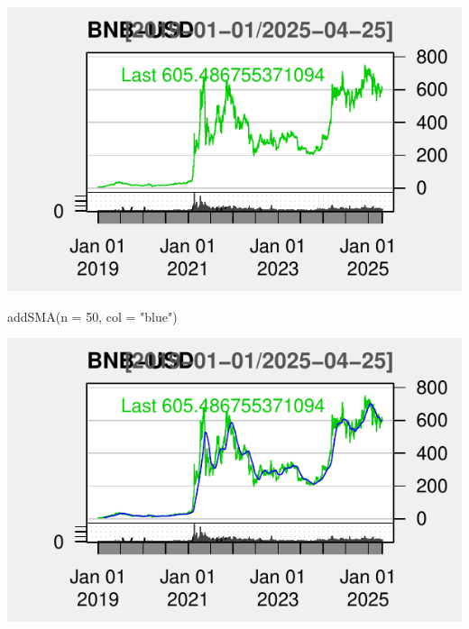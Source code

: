 \documentclass[]{tufte-handout}
\newenvironment{Shaded}{}{}
\newcommand{\AttributeTok}[1]{\textcolor[rgb]{0.49,0.56,0.16}{#1}}
\newcommand{\DecValTok}[1]{\textcolor[rgb]{0.25,0.63,0.44}{#1}}
\newcommand{\FunctionTok}[1]{\textcolor[rgb]{0.02,0.16,0.49}{#1}}
\newcommand{\NormalTok}[1]{#1}
\newcommand{\OtherTok}[1]{\textcolor[rgb]{0.00,0.44,0.13}{#1}}
\newcommand{\SpecialCharTok}[1]{\textcolor[rgb]{0.25,0.44,0.63}{#1}}
\newcommand{\StringTok}[1]{\textcolor[rgb]{0.25,0.44,0.63}{#1}}
\begin{document}
\begin{Shaded}
\end{Shaded}

\includegraphics{cripto_update_files/figure-latex/unnamed-chunk-8-1}

\begin{Shaded}
\begin{Highlighting}[]
\FunctionTok{addSMA}\NormalTok{(}\AttributeTok{n =} \DecValTok{50}\NormalTok{, }\AttributeTok{col =} \StringTok{"blue"}\NormalTok{)}
\end{Highlighting}
\end{Shaded}

\includegraphics{cripto_update_files/figure-latex/unnamed-chunk-8-2}
\end{document}
